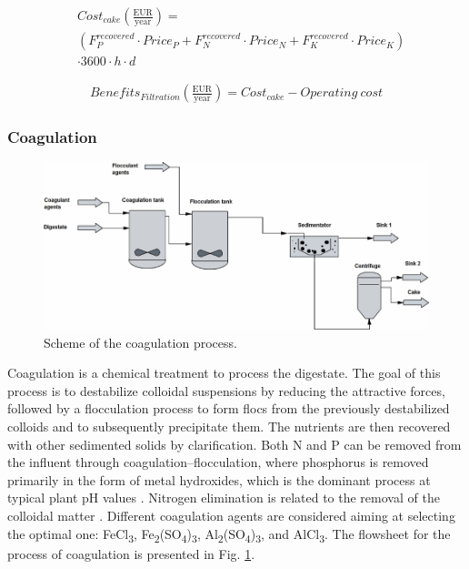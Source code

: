 \begin{refsection}[referencesCh2]
\begin{align}
	& Cost_{cake} \left( \frac{\text{EUR}}{\text{year}} \right) = \label{eq:Eq15} \\ 
	& \left( {F_P^{recovered}\cdot{Price_P} + F_N^{recovered}\cdot{Price}_N} + F_K^{recovered}\cdot{Price_K} \right) \nonumber \\
	& \cdot 3600\cdot h \cdot d \nonumber
\end{align}

\begin{align}
	{{Benefits}}_{Filtration} \left(\frac{\text{EUR}}{\text{year}}  \right) = Cost_{cake} - {{Operating \  cost}} \label{eq:Eq16}
\end{align}

\subsubsection{Coagulation}
\begin{figure}[h!]
	\centering
	\includegraphics[width=1\linewidth, trim={0cm 0cm 0cm 0cm},clip]{gfx/Chapter2/Fig3.pdf} 
	\caption{Scheme of the coagulation process.}
	\label{fig:CoagScheme}
\end{figure}

Coagulation is a chemical treatment to process the digestate. The goal of this process is to destabilize colloidal suspensions by reducing the attractive forces, followed by a flocculation process to form flocs from the previously destabilized colloids and to subsequently precipitate them. The nutrients are then recovered with other sedimented solids by clarification. Both N and P can be removed from the influent through coagulation–flocculation, where phosphorus is removed primarily in the form of metal hydroxides, which is the dominant process at typical plant pH values \citep{szabo2008significance}. Nitrogen elimination is related to the removal of the colloidal matter \citep{aguilar2002nutrient}. Different coagulation agents are considered aiming at selecting the optimal one: FeCl\textsubscript{3}, Fe\textsubscript{2}(SO\textsubscript{4})\textsubscript{3}, Al\textsubscript{2}(SO\textsubscript{4})\textsubscript{3}, and AlCl\textsubscript{3}. The flowsheet for the process of coagulation is presented in Fig. \ref{fig:CoagScheme}.


\end{refsection}
